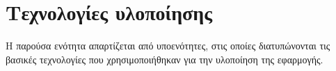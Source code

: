 \section{Τεχνολογίες υλοποίησης}

Η παρούσα ενότητα απαρτίζεται από υποενότητες, στις οποίες διατυπώνονται τις βασικές τεχνολογίες που χρησιμοποιήθηκαν για την υλοποίηση της εφαρμογής.





